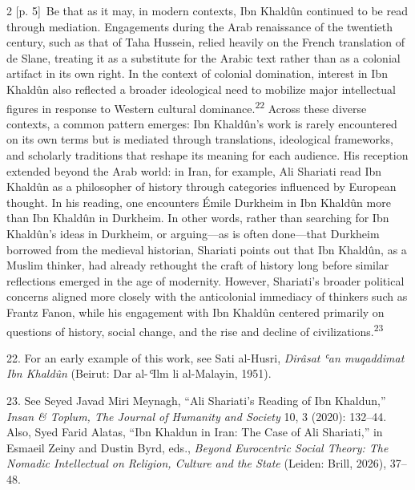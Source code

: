 \documentclass[10pt,a4paper]{article}
\begin{document}
\begin{paracol}{2}
{\scriptsize\color{gray} [p. 5]}\ Be that as it may, in modern contexts, Ibn Khaldûn continued to be read through mediation. Engagements during the Arab renaissance of the twentieth century, such as that of Taha Hussein, relied heavily on the French translation of de Slane, treating it as a substitute for the Arabic text rather than as a colonial artifact in its own right. In the context of colonial domination, interest in Ibn Khaldûn also reflected a broader ideological need to mobilize major intellectual figures in response to Western cultural dominance.\nobreak\textsuperscript{22} Across these diverse contexts, a common pattern emerges: Ibn Khaldûn’s work is rarely encountered on its own terms but is mediated through translations, ideological frameworks, and scholarly traditions that reshape its meaning for each audience. His reception extended beyond the Arab world: in Iran, for example, Ali Shariati read Ibn Khaldûn as a philosopher of history through categories influenced by European thought. In his reading, one encounters Émile Durkheim in Ibn Khaldûn more than Ibn Khaldûn in Durkheim. In other words, rather than searching for Ibn Khaldûn’s ideas in Durkheim, or arguing—as is often done—that Durkheim borrowed from the medieval historian, Shariati points out that Ibn Khaldûn, as a Muslim thinker, had already rethought the craft of history long before similar reflections emerged in the age of modernity. However, Shariati’s broader political concerns aligned more closely with the anticolonial immediacy of thinkers such as Frantz Fanon, while his engagement with Ibn Khaldûn centered primarily on questions of history, social change, and the rise and decline of civilizations.\nobreak\textsuperscript{23}\par{\small 22. For an early example of this work, see Sati al-Husri, \textit{Dirâsat ʿan muqaddimat Ibn Khaldûn} (Beirut: Dar al-\textit{ʿ}Ilm li al-Malayin, 1951).\par}{\small 23. See Seyed Javad Miri Meynagh, “Ali Shariati’s Reading of Ibn Khaldun,” \textit{Insan \& Toplum, The Journal of Humanity and Society} 10, 3 (2020): 132–44. Also, Syed Farid Alatas, “Ibn Khaldun in Iran: The Case of Ali Shariati,” in Esmaeil Zeiny and Dustin Byrd, eds., \textit{Beyond Eurocentric Social Theory: The Nomadic Intellectual on Religion, Culture and the State} (Leiden: Brill, 2026), 37–48.\par}
\switchcolumn*

\end{paracol}
\end{document}

